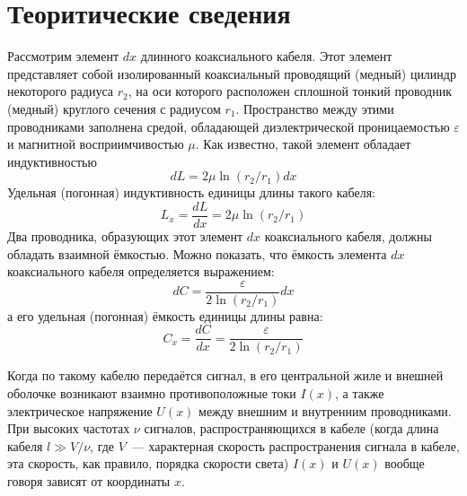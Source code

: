 \section{Теоритические сведения}
\begin{figure}[ht!]
\end{figure}


Рассмотрим элемент $dx$ длинного коаксиального кабеля. Этот элемент представляет
собой изолированный коаксиальный проводящий (медный) цилиндр некоторого радиуса
$r_{2}$, на оси которого расположен сплошной тонкий проводник (медный) круглого сечения с
радиусом $r_{1}$.  Пространство между этими проводниками заполнена средой, обладающей
диэлектрической проницаемостью $ \varepsilon$ и магнитной восприимчивостью $ \mu$.
 Как известно, такой элемент обладает индуктивностью
 \[
     dL = 2 \mu\ln\left(r_{2}/r_{1}\right)dx
 \]
 Удельная (погонная) индуктивность единицы длины такого кабеля:
 \[
     L_{x} = \frac{dL}{dx} = 2\mu\ln\left(r_{2}/r_{1}\right)
 \]
 Два проводника, образующих этот элемент $dx$  коаксиального кабеля, должны обладать
 взаимной ёмкостью. Можно показать, что ёмкость элемента $dx$  коаксиального кабеля
 определяется выражением:
 \[
     dC = \frac{ \varepsilon}{2\ln\left(r_{2}/r_{1}\right)}dx
 \]
 а его удельная (погонная) ёмкость единицы длины равна:
 \[
     C_{x} = \frac{dC}{dx} = \frac{ \varepsilon}{2\ln\left(r_{2}/r_{1}\right)}
 \]
 
 Когда по такому кабелю передаётся сигнал, в его центральной жиле и внешней оболочке
 возникают взаимно противоположные токи $I(x)$,  а также электрическое напряжение $U(x)$
 между внешним и внутренним проводниками. При высоких частотах $\nu$ сигналов,
 распространяющихся в кабеле (когда длина кабеля $l\gg V/\nu$, где $V$~--- характерная скорость
 распространения сигнала в кабеле,  эта скорость, как правило, порядка скорости света)
 $I(x)$ и $U(x)$ вообще говоря зависят от координаты $x$.

